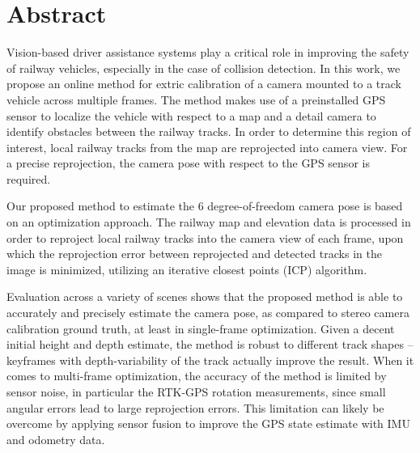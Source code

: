 \chapter*{Abstract}



Vision-based driver assistance systems play a critical role in improving the safety of railway vehicles, especially in the case of collision detection. In this work, we propose an online method for extric calibration of a camera mounted to a track vehicle across multiple frames. The method makes use of a preinstalled GPS sensor to localize the vehicle with respect to a map and a detail camera to identify obstacles between the railway tracks. In order to determine this region of interest, local railway tracks from the map are reprojected into camera view. For a precise reprojection, the camera pose with respect to the GPS sensor is required.

Our proposed method to estimate the 6 degree-of-freedom camera pose is based on an optimization approach. The railway map and elevation data is processed in order to reproject local railway tracks into the camera view of each frame, upon which the reprojection error between reprojected and detected tracks in the image is minimized, utilizing an iterative closest points (ICP) algorithm.

Evaluation across a variety of scenes shows that the proposed method is able to accurately and precisely estimate the camera pose, as compared to stereo camera calibration ground truth, at least in single-frame optimization. Given a decent initial height and depth estimate, the method is robust to different track shapes -- keyframes with depth-variability of the track actually improve the result. When it comes to multi-frame optimization, the accuracy of the method is limited by sensor noise, in particular the RTK-GPS rotation measurements, since small angular errors lead to large reprojection errors. This limitation can likely be overcome by applying sensor fusion to improve the GPS state estimate with IMU and odometry data.